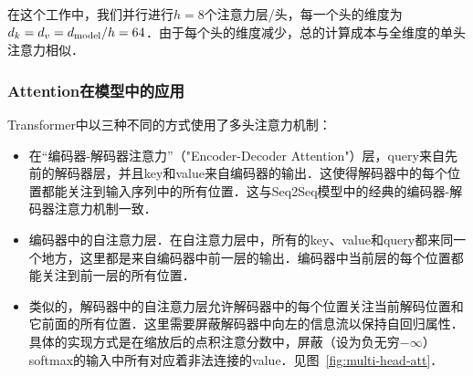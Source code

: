 在这个工作中，我们并行进行$h=8$个注意力层/头，每一个头的维度为$d_k=d_v=d_{\text{model}}/h=64$．由于每个头的维度减少，总的计算成本与全维度的单头注意力相似．

\subsubsection{Attention在模型中的应用}

Transformer中以三种不同的方式使用了多头注意力机制：
\begin{itemize}
 \item 在“编码器-解码器注意力”（"Encoder-Decoder Attention"）层，query来自先前的解码器层，并且key和value来自编码器的输出．这使得解码器中的每个位置都能关注到输入序列中的所有位置．这与Seq2Seq模型中的经典的编码器-解码器注意力机制一致\citep{wu2016google, bahdanau2014neural,JonasFaceNet2017}．

 \item 编码器中的自注意力层．在自注意力层中，所有的key、value和query都来同一个地方，这里都是来自编码器中前一层的输出．编码器中当前层的每个位置都能关注到前一层的所有位置．

 \item 类似的，解码器中的自注意力层允许解码器中的每个位置关注当前解码位置和它前面的所有位置．这里需要屏蔽解码器中向左的信息流以保持自回归属性．具体的实现方式是在缩放后的点积注意分数中，屏蔽（设为负无穷$-\infty$）softmax的输入中所有对应着非法连接的value．见图~\ref{fig:multi-head-att}．

\end{itemize}

